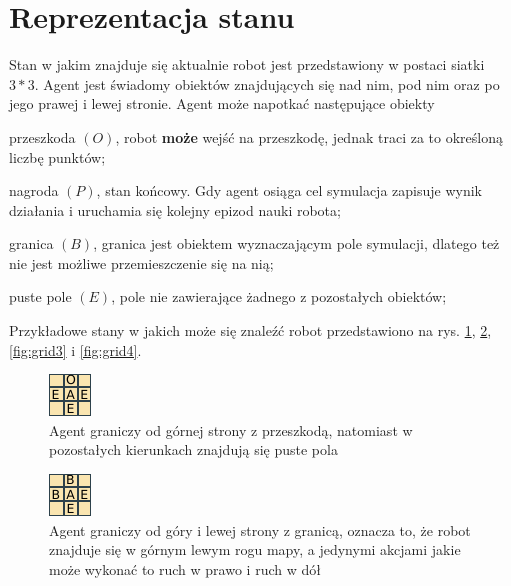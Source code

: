 \section{Reprezentacja stanu}
\label{sec:reprezentacjastanu}

Stan w jakim znajduje się aktualnie robot jest przedstawiony w postaci siatki $3*3$. Agent jest świadomy obiektów 
znajdujących się nad nim, pod nim oraz po jego prawej i lewej stronie.
Agent może napotkać następujące obiekty
\begin{description}
 \item przeszkoda $(O)$, robot \textbf{może} wejść na przeszkodę, jednak traci za to określoną liczbę punktów;
 \item nagroda $(P)$, stan końcowy. Gdy agent osiąga cel symulacja zapisuje wynik działania i uruchamia się kolejny 
epizod nauki robota;
 \item granica $(B)$, granica jest obiektem wyznaczającym pole symulacji, dlatego też nie jest możliwe przemieszczenie 
się na nią;
  \item puste pole $(E)$, pole nie zawierające żadnego z pozostałych obiektów;
\end{description}
 
Przykładowe stany w jakich może się znaleźć robot przedstawiono na rys. \ref{fig:grid1}, \ref{fig:grid2}, 
\ref{fig:grid3} i \ref{fig:grid4}.

\begin{figure}[H]
    \centering
    \includegraphics[scale=10]{grid1}
    \caption{Agent graniczy od górnej strony z przeszkodą, natomiast w pozostałych kierunkach znajdują się puste pola}
    \label{fig:grid1}
\end{figure}

\begin{figure}[H]
    \centering
    \includegraphics[scale=10]{grid2}
    \caption{Agent graniczy od góry i lewej strony z granicą, oznacza to, że robot znajduje się w górnym lewym rogu 
mapy, a jedynymi akcjami jakie może wykonać to ruch w prawo i ruch w dół}
    \label{fig:grid2}
\end{figure}

